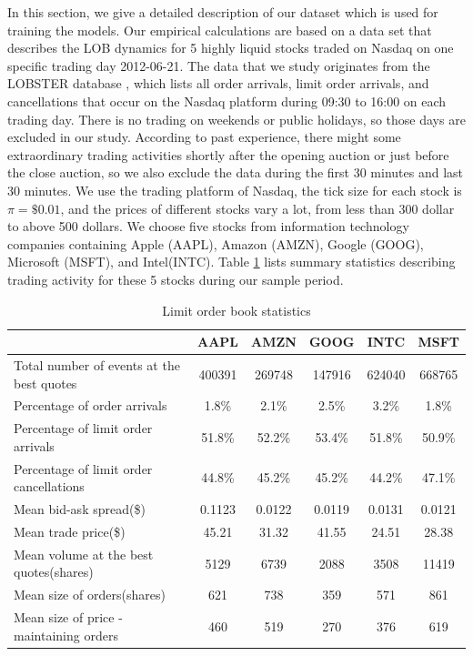 In this section,   we give a detailed description of our dataset which is used for training the models. Our empirical calculations are based on a data set that describes the LOB dynamics for 5 highly liquid stocks traded on Nasdaq on one specific trading day 2012-06-21. The data
that we study originates from the LOBSTER database \cite{huang2015simulating},   which lists all  order arrivals,   limit order arrivals,   and cancellations that occur on the Nasdaq platform during 09:30 to 16:00 on each trading day. There is no trading on weekends or public holidays,   so those days are excluded in our study. According to past experience,  there might some extraordinary trading activities shortly after the opening auction or just before the close auction,   so we also exclude the data during the first 30 minutes and last 30 minutes. We use the trading platform of Nasdaq,   the tick size for each stock is $\pi = \$0.01$,   and the prices of different stocks vary a lot,   from less than 300 dollar to above 500 dollars.  We choose five stocks from information technology companies containing Apple (AAPL),   Amazon (AMZN),   Google (GOOG),  Microsoft (MSFT),   and  Intel(INTC). Table \ref{tab:statistics} lists summary statistics describing trading activity
for these 5 stocks during our sample period.
\begin{table}
	\caption{Limit order book statistics}
	\label{tab:statistics}
	\begin{center}
		\begin{tabular}{|l|c|c|c|c|c|}
			\hline
			 & AAPL & AMZN & GOOG & INTC & MSFT\\[5pt]
			 \hline
		Total number of events at the best quotes& 400391 & 269748 & 147916 & 624040 & 668765 \\[5pt]
			Percentage of  order arrivals & 1.8\% & 2.1\% & 2.5\% & 3.2\% & 1.8\% \\[5pt]
		Percentage of limit order arrivals& 51.8\% & 52.2\% & 53.4\% & 51.8\%& 50.9\%\\[5pt]
			Percentage of limit order cancellations & 44.8\% & 45.2\% & 45.2\% & 44.2\% & 47.1\%\\[5pt]		
		Mean bid-ask spread(\$)& 0.1123& 0.0122& 0.0119& 0.0131& 0.0121\\[5pt]
		Mean trade price(\$)& 45.21 & 31.32& 41.55& 24.51& 28.38\\[5pt]
		 Mean volume at the best quotes(shares)& 5129& 6739& 2088& 3508& 11419\\[5pt]
		Mean size of  orders(shares)& 621 & 738 & 359 & 571 & 861\\[5pt]
		Mean size of price - maintaining  orders & 460& 519& 270& 376& 619\\[5pt]
		\hline
		\end{tabular}
	\end{center}
\end{table}
